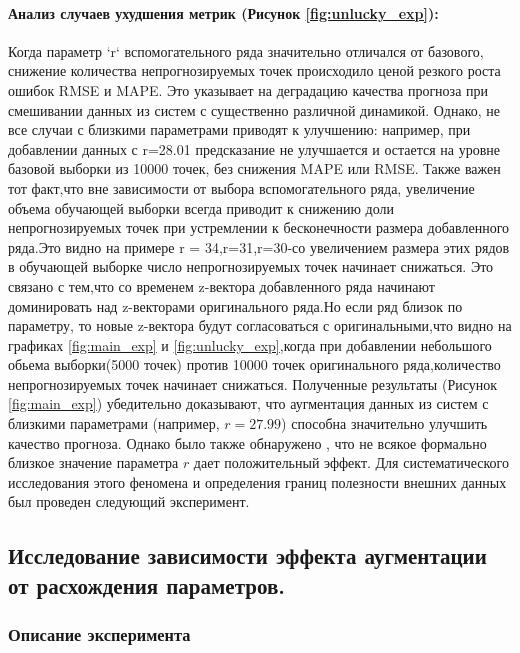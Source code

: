 \documentclass[a4paper,12pt]{extarticle}
\begin{document}
\paragraph{Анализ случаев ухудшения метрик (Рисунок \ref{fig:unlucky_exp}):}
 Когда параметр `r` вспомогательного ряда значительно отличался от базового,
  снижение количества непрогнозируемых точек происходило ценой резкого роста
   ошибок RMSE и MAPE. Это указывает на деградацию качества прогноза при
   смешивании данных из систем с существенно различной динамикой. Однако,
    не все случаи с близкими параметрами приводят к улучшению:
    например, при добавлении данных с r=28.01 предсказание не улучшается
     и остается на уровне базовой выборки из 10000 точек, без снижения MAPE или RMSE.
Также важен тот факт,что вне зависимости от выбора вспомогательного ряда,
  увеличение объема обучающей выборки всегда приводит к снижению доли
   непрогнозируемых точек при устремлении к бесконечности размера добавленного ряда.Это видно на примере 
   r = 34,r=31,r=30-со увеличением размера этих рядов в обучающей выборке
    число непрогнозируемых точек начинает снижаться.
     Это связано с тем,что со временем z-вектора добавленного ряда начинают 
   доминировать над z-векторами оригинального ряда.Но если  ряд близок по параметру, то новые z-вектора будут согласоваться
    с оригинальными,что видно на графиках \ref{fig:main_exp}  и \ref{fig:unlucky_exp},когда при добавлении небольшого 
    обьема выборки(5000 точек) против 10000 точек оригинального ряда,количество 
    непрогнозируемых точек начинает снижаться.
Полученные результаты (Рисунок \ref{fig:main_exp}) убедительно доказывают,
что аугментация данных из систем с близкими параметрами (например, \(r=27.99\))
 способна значительно улучшить качество прогноза. Однако было также обнаружено
 , что не всякое формально близкое значение параметра \(r\) дает положительный эффект.
  Для систематического исследования этого феномена и определения границ полезности
  внешних данных был проведен следующий эксперимент.

\subsection{Исследование зависимости эффекта аугментации от расхождения параметров.}
\subsubsection{Описание эксперимента}
\end{document}
